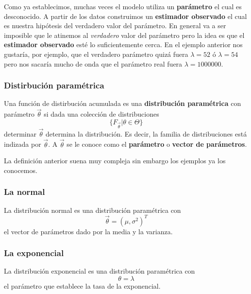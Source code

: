 \documentclass[
]{book}
\newenvironment{Ejemplo}
{\begin{mdframed}[
  linecolor=ejemplocolor,
  skipabove=12pt,
  skipbelow=12pt,
  roundcorner=20pt,
  splittopskip=2\topsep]}
{\end{mdframed}}
\newenvironment{Definicion}
{\begin{mdframed}[
  linecolor=definicioncolor,
  skipabove=12pt,
  skipbelow=12pt,
  roundcorner=20pt,
  splittopskip=2\topsep]}
{\end{mdframed}}
\begin{document}
Como ya establecimos, muchas veces el modelo utiliza un \textbf{parámetro} el cual es desconocido. A partir de los datos construimos un \textbf{estimador observado} el cual es nuestra hipótesis del verdadero valor del parámetro. En general va a ser imposible que le atinemos al \emph{verdadero} valor del parámetro pero la idea es que el \textbf{estimador observado} esté lo suficientemente cerca. En el ejemplo anterior nos gustaría, por ejemplo, que el verdadero parámetro quizá fuera \(\lambda = 52\) ó \(\lambda = 54\) pero nos sacaría mucho de onda que el parámetro real fuera \(\lambda = 1000000\).

\begin{Definicion}
\hypertarget{distirbuciuxf3n-paramuxe9trica}{%
\subsubsection{Distirbución
paramétrica}\label{distirbuciuxf3n-paramuxe9trica}}

Una función de distirbución acumulada es una \textbf{distribución
paramétrica} con parámetro \(\vec{\theta}\) si dada una colección de
distribuciones \[
\{ F_{\vec{\theta}} | \theta \in \Theta \}
\] determinar \(\vec{\theta}\) determina la distribución. Es decir, la
familia de distribuciones está indizada por \(\vec{\theta}\). A
\(\vec{\theta}\) se le conoce como el \textbf{parámetro} o
\textbf{vector de parámetros}.
\end{Definicion}

La definición anterior suena muy compleja sin embargo los ejemplos ya los conocemos.

\begin{Ejemplo}
\hypertarget{la-normal}{%
\subsubsection{La normal}\label{la-normal}}

La distribución normal es una distribución paramétrica con \[
\vec{\theta} = (\mu, \sigma^2)^T
\] el vector de parámetros dado por la media y la varianza.
\end{Ejemplo}

\begin{Ejemplo}
\hypertarget{la-exponencial}{%
\subsubsection{La exponencial}\label{la-exponencial}}

La distribución exponencial es una distribución paramétrica con \[
\theta = \lambda
\] el parámetro que establece la tasa de la exponencial.
\end{Ejemplo}
\end{document}
